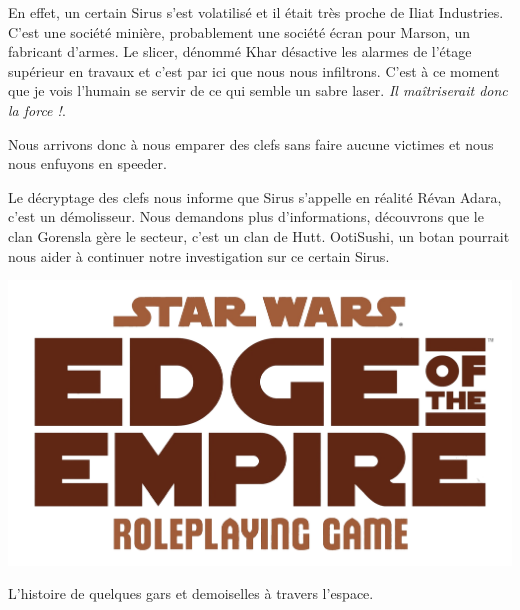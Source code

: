 \documentclass[a4paper,9pt,twoside,twocolumn,openany]{book}
\begin{document}
En effet, un certain Sirus s'est volatilisé et il était très proche de Iliat Industries. C'est une société minière, probablement une société écran pour Marson, un fabricant d'armes. Le slicer, dénommé Khar désactive les alarmes de l'étage supérieur en travaux et c'est par ici que nous nous infiltrons. C'est à ce moment que je vois l'humain se servir de ce qui semble un sabre laser. \emph{Il maîtriserait donc la force !}.

Nous arrivons donc à nous emparer des clefs sans faire aucune victimes et nous nous enfuyons en speeder.

Le décryptage des clefs nous informe que Sirus s'appelle en réalité Révan Adara, c'est un démolisseur. Nous demandons plus d'informations, découvrons que le clan Gorensla gère le secteur, c'est un clan de Hutt. OotiSushi, un botan pourrait nous aider à continuer notre investigation sur ce certain Sirus.

\clearevenpage

\onecolumn
\Large

\centering

\vfill

\includegraphics[width=1\textwidth]{img/SWEotE}


\vfill

L'histoire de quelques gars et demoiselles à travers l'espace.
\vfill

\end{document}
